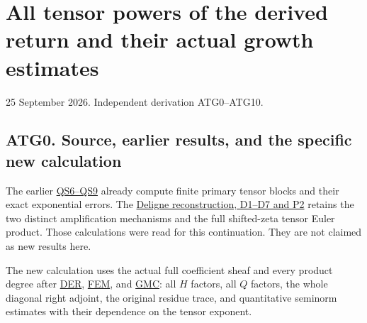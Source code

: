 \chapter{All tensor powers of the derived return and their actual growth
estimates}\label{all-tensor-powers-of-the-derived-return-and-their-actual-growth-estimates}

25 September 2026. Independent derivation ATG0--ATG10.

\section{ATG0. Source, earlier results, and the specific new
calculation}\label{atg0.-source-earlier-results-and-the-specific-new-calculation}

The earlier
\href{https://github.com/KokunoYumeto/zeta-function-research-reader/blob/36a82ecca98addb8a98b48204e349737856c7223/workbenches/splitzero-tandem/continuations/20260924-cohomology-weight-and-character-lifts/original-character-lifting/deligne_quotient_weight_20260924/QUOTIENTS_AND_TENSOR_WEIGHT_ERROR.md}{QS6--QS9}
already compute finite primary tensor blocks and their exact exponential
errors. The
\href{https://github.com/KokunoYumeto/zeta-function-research-reader/blob/36a82ecca98addb8a98b48204e349737856c7223/workbenches/splitzero-tandem/continuations/20260924-cohomology-weight-and-character-lifts/original-character-lifting/deligne_quotient_weight_20260924/DELIGNE_GLOBAL_QUOTIENT_AND_WEIGHT.md}{Deligne
reconstruction, D1--D7 and P2} retains the two distinct amplification
mechanisms and the full shifted-zeta tensor Euler product. Those
calculations were read for this continuation. They are not claimed as
new results here.

The new calculation uses the actual full coefficient sheaf and every
product degree after
\href{https://github.com/KokunoYumeto/zeta-function-research-reader/blob/main/workbenches/splitzero-tandem/continuations/20260925-full-source-tensor-and-original-divisor/counterfactual/DIAGONAL_EXTRAORDINARY_RETURN.md}{DER},
\href{https://github.com/KokunoYumeto/zeta-function-research-reader/blob/main/workbenches/splitzero-tandem/continuations/20260925-full-source-tensor-and-original-divisor/counterfactual/FULL_SOURCE_RETURN_EQUIVARIANCE_AND_MIXED_TENSOR_CLASS.md}{FEM},
and
\href{https://github.com/KokunoYumeto/zeta-function-research-reader/blob/main/workbenches/splitzero-tandem/continuations/20260925-full-source-tensor-and-original-divisor/counterfactual/GLOBAL_MIXED_RETURN_CONTRACTION.md}{GMC}:
all \(H\) factors, all \(Q\) factors, the whole diagonal right adjoint,
the original residue trace, and quantitative seminorm estimates with
their dependence on the tensor exponent.

